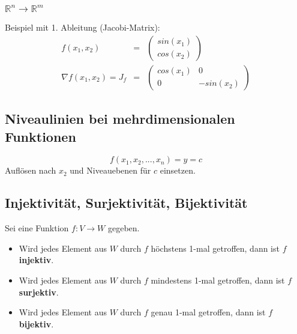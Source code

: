 \subsubsection{$\mathbb{R}^n \rightarrow \mathbb{R}^m$}
\label{ssub:rnrm}
Beispiel mit 1. Ableitung (Jacobi-Matrix): 
\begin{eqnarray*}
	f(x_1,x_2) &=& \left(\begin{array}{c} sin(x_1) \\ cos(x_2)\end{array}\right) \\
	\nabla f(x_1,x_2) = J_f &=& \left( \begin{array}{cc} cos(x_1) & 0 \\ 0 & -sin(x_2) \end{array} \right)
\end{eqnarray*}	

\subsection{Niveaulinien bei mehrdimensionalen Funktionen}
\label{sub:niveaulinien_bei_mehrdimensionalen_funktionen}

\begin{equation}
	f(x_1,x_2,...,x_n) = y = c
\end{equation}
Auflösen nach $x_2$ und Niveauebenen für $c$ einsetzen.

\subsection{Injektivit\"{a}t, Surjektivit\"{a}t, Bijektivit\"{a}t}
\label{sub:injektivitaet_surjektivitaet_bijektivitaet}

Sei eine Funktion $f : V \rightarrow W$ gegeben.

\begin{itemize}
	\item Wird jedes Element aus $W$ durch $f$ höchstens 1-mal getroffen, dann ist $f$ \textbf{injektiv}.
	\item Wird jedes Element aus $W$ durch $f$ mindestens 1-mal getroffen, dann ist $f$ \textbf{surjektiv}.
	\item Wird jedes Element aus $W$ durch $f$ genau 1-mal getroffen, dann ist $f$ \textbf{bijektiv}.
\end{itemize}

